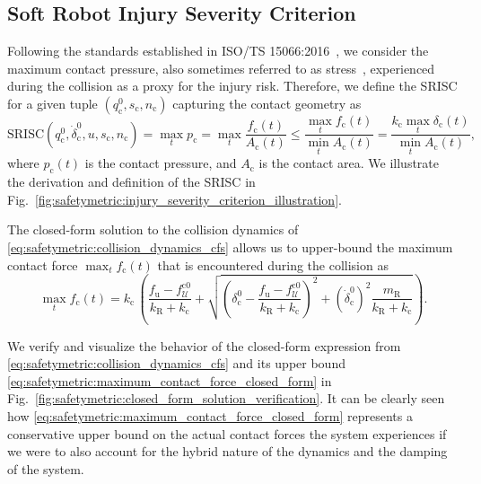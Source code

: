 \subsection{Soft Robot Injury Severity Criterion}
Following the standards established in ISO/TS 15066:2016~\citep{iso2016collaborative}, we consider the maximum contact pressure, also sometimes referred to as stress~\citep{haddadin2009requirements}, experienced during the collision as a proxy for the injury risk. Therefore, we define the \gls{SRISC} for a given tuple $(q_{\mathrm{c}}^0,s_\mathrm{c}, n_\mathrm{c})$ capturing the contact geometry as
\begin{equation}
    \mathrm{SRISC}(q_{\mathrm{c}}^0,\dot{\delta}_\mathrm{c}^0,u,s_\mathrm{c},n_\mathrm{c}) = \max_t p_\mathrm{c} = \max_t \frac{f_\mathrm{c}(t)}{A_\mathrm{c}(t)} \leq \frac{\max_t f_\mathrm{c}(t)}{\min_t A_\mathrm{c}(t)} =  \frac{k_\mathrm{c} \max_t \delta_\mathrm{c}(t)}{\min_t A_\mathrm{c}(t)},
\end{equation}
where $p_\mathrm{c}(t)$ is the contact pressure, and $A_\mathrm{c}$ is the contact area. We illustrate the derivation and definition of the \gls{SRISC} in Fig.~\ref{fig:safetymetric:injury_severity_criterion_illustration}.

The closed-form solution to the collision dynamics of \eqref{eq:safetymetric:collision_dynamics_cfs} allows us to upper-bound the maximum contact force $\max_t f_\mathrm{c}(t)$ that is encountered during the collision as
\begin{equation}\label{eq:safetymetric:maximum_contact_force_closed_form}
     \max_{t}f_\mathrm{c}(t) = k_\mathrm{c} \, \left ( \frac{f_\mathrm{u}-f_{\mathcal{U}}^{\mathrm{c}0}}{k_\mathrm{R} + k_\mathrm{c}} + \sqrt{\left ( \delta_\mathrm{c}^0 - \frac{f_\mathrm{u}-f_{\mathcal{U}}^{\mathrm{c}0}}{k_\mathrm{R} + k_\mathrm{c}} \right )^2 + \left (\dot{\delta}_\mathrm{c}^0 \right )^2 \frac{m_\mathrm{R}}{k_\mathrm{R} + k_\mathrm{c}} } \right ).
\end{equation}

We verify and visualize the behavior of the closed-form expression from \eqref{eq:safetymetric:collision_dynamics_cfs} and its upper bound \eqref{eq:safetymetric:maximum_contact_force_closed_form} in Fig.~\ref{fig:safetymetric:closed_form_solution_verification}. It can be clearly seen how \eqref{eq:safetymetric:maximum_contact_force_closed_form} represents a conservative upper bound on the actual contact forces the system experiences if we were to also account for the hybrid nature of the dynamics and the damping of the system.

